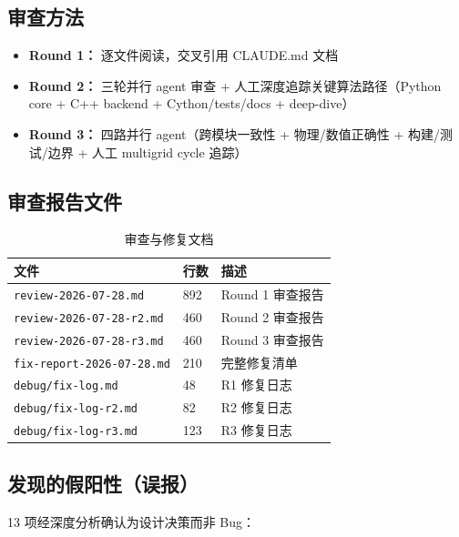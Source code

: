 \documentclass[11pt,a4paper]{article}
\begin{document}
\subsection{审查方法}

\begin{itemize}
    \item \textbf{Round 1：} 逐文件阅读，交叉引用 CLAUDE.md 文档
    \item \textbf{Round 2：} 三轮并行 agent 审查 + 人工深度追踪关键算法路径（Python core + C++ backend + Cython/tests/docs + deep-dive）
    \item \textbf{Round 3：} 四路并行 agent（跨模块一致性 + 物理/数值正确性 + 构建/测试/边界 + 人工 multigrid cycle 追踪）
\end{itemize}

\subsection{审查报告文件}

\begin{table}[ht]
\centering
\caption{审查与修复文档}
\begin{tabular}{lll}
\toprule
文件 & 行数 & 描述 \\
\midrule
\texttt{review-2026-07-28.md} & 892 & Round 1 审查报告 \\
\texttt{review-2026-07-28-r2.md} & 460 & Round 2 审查报告 \\
\texttt{review-2026-07-28-r3.md} & 460 & Round 3 审查报告 \\
\texttt{fix-report-2026-07-28.md} & 210 & 完整修复清单 \\
\texttt{debug/fix-log.md} & 48 & R1 修复日志 \\
\texttt{debug/fix-log-r2.md} & 82 & R2 修复日志 \\
\texttt{debug/fix-log-r3.md} & 123 & R3 修复日志 \\
\bottomrule
\end{tabular}
\end{table}

\subsection{发现的假阳性（误报）}

13 项经深度分析确认为设计决策而非 Bug：
\end{document}
